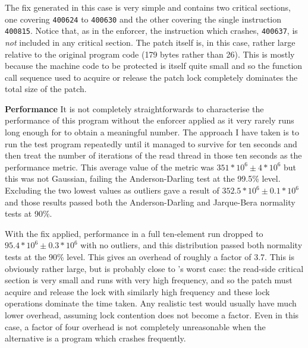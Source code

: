


The fix generated in this case is very simple and contains two
critical sections, one covering \verb|400624| to \verb|400630| and the
other covering the single instruction \verb|400815|.  Notice that, as
in the enforcer, the instruction which crashes, \verb|400637|, is
\emph{not} included in any critical section.  The patch itself is, in
this case, rather large relative to the original program code (179
bytes rather than 26).  This is mostly because the machine code to be
protected is itself quite small and so the function call sequence used
to acquire or release the patch lock completely dominates the total
size of the patch.

\textbf{Performance} It is not completely straightforwards to
characterise the performance of this program without the enforcer
applied as it very rarely runs long enough for to obtain a meaningful
number.  The approach I have taken is to run the test program
repeatedly until it managed to survive for ten seconds and then treat
the number of iterations of the read thread in those ten seconds as
the performance metric.  This average value of the metric was
$351*10^6 \pm 4*10^6$ but this was not Gaussian, failing the
Anderson-Darling test at the 99.5\% level.  Excluding the two lowest
values as outliers gave a result of $352.5 * 10^6 \pm 0.1 * 10^6$ and
those results passed both the Anderson-Darling and Jarque-Bera
normality tests at 90\%.

With the fix applied, performance in a full ten-element run dropped to
$95.4 * 10^6 \pm 0.3 * 10^6$ with no outliers, and this distribution
passed both normality tests at the 90\% level.  This gives an overhead
of roughly a factor of 3.7.  This is obviously rather large, but is
probably close to {\technique}'s worst case: the read-side critical
section is very small and runs with very high frequency, and so the
patch must acquire and release the lock with similarly high frequency
and these lock operations dominate the time taken.  Any realistic test
would usually have much lower overhead, assuming lock contention does
not become a factor.  Even in this case, a factor of four overhead is
not completely unreasonable when the alternative is a program which
crashes frequently.

